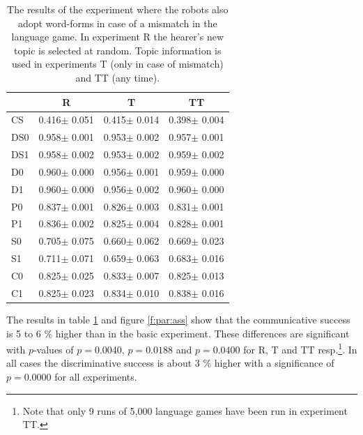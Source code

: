 \begin{table}
\centering
\begin{tabular}{||l|c|c|c||}
\hline\hline
        &       R                       &       T                      &       TT     \\\hline
CS      &          0.416$\pm$      0.051&          0.415$\pm$      0.014&          0.398$\pm$      0.004\\\hline
DS0     &          0.958$\pm$      0.001&          0.953$\pm$      0.002&          0.957$\pm$      0.001\\\hline
DS1     &          0.958$\pm$      0.002&          0.953$\pm$      0.002&          0.959$\pm$      0.002\\\hline
D0      &          0.960$\pm$      0.000&          0.956$\pm$      0.001&          0.959$\pm$      0.000\\\hline
D1      &          0.960$\pm$      0.000&          0.956$\pm$      0.002&          0.960$\pm$      0.000\\\hline
P0      &          0.837$\pm$      0.001&          0.826$\pm$      0.003&          0.831$\pm$      0.001\\\hline
P1      &          0.836$\pm$      0.002&          0.825$\pm$      0.004&          0.828$\pm$      0.001\\\hline
S0      &          0.705$\pm$      0.075&          0.660$\pm$      0.062&          0.669$\pm$      0.023\\\hline
S1      &          0.711$\pm$      0.071&          0.659$\pm$      0.063&          0.683$\pm$      0.016\\\hline
C0      &          0.825$\pm$      0.025&          0.833$\pm$      0.007&          0.825$\pm$      0.013\\\hline
C1      &          0.825$\pm$      0.023&          0.834$\pm$      0.010&          0.838$\pm$      0.016\\\hline
\hline
\end{tabular}
\caption{The results of the experiment where the robots also adopt word-forms in case of a mismatch in the language game. In experiment R the hearer's new topic is selected at random. Topic information is used in experiments T (only in case of mismatch) and TT (any time).}
\label{t:lex:ass}
\end{table}

The results in table \ref{t:lex:ass} and figure \ref{f:par:ass} show that the communicative success is 5 to 6 \% higher than in the basic experiment. These differences are significant with $p$-values of $p=0.0040$, $p=0.0188$ and $p=0.0400$ for R, T and TT resp.\footnote{Note that only 9 runs of 5,000 language games have been run in experiment TT.}. In all cases the discriminative success is about 3 \% higher with a significance of $p=0.0000$ for all experiments.

